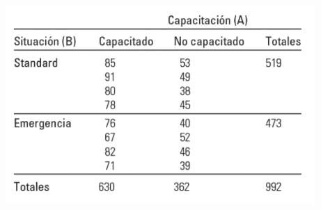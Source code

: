 \documentclass[a4paper,12pt]{article}
\begin{document}
\begin{center}
    \includegraphics[scale=0.8]{Imagenes/tabla.png}
\end{center}
\end{document}
